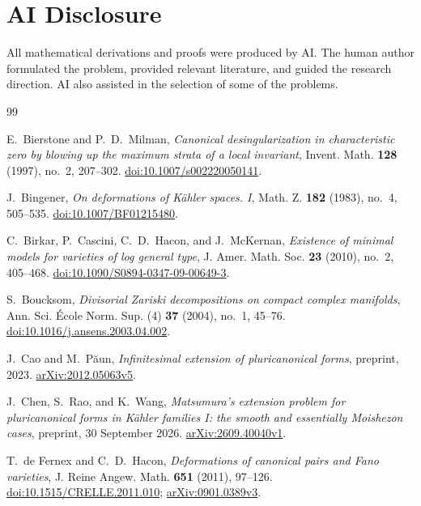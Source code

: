 \documentclass[11pt,a4paper]{article}
\numberwithin{equation}{section}
\theoremstyle{definition}
\theoremstyle{remark}
\begin{document}
\section*{AI Disclosure}
All mathematical derivations and proofs were produced by AI. The human
author formulated the problem, provided relevant literature, and guided
the research direction. AI also assisted in the selection of some of the
problems.
\begin{thebibliography}{99}
\small
\setlength{\itemsep}{4pt}
\setlength{\parsep}{0pt}
\setlength{\parskip}{0pt}
\raggedright
{}

E.~Bierstone and P.~D.~Milman,
\emph{Canonical desingularization in characteristic zero by
blowing up the maximum strata of a local invariant},
Invent. Math. \textbf{128} (1997), no.~2, 207--302.
\href{https://doi.org/10.1007/s002220050141}{doi:10.1007/s002220050141}.

J.~Bingener,
\emph{On deformations of Kähler spaces. I},
Math. Z. \textbf{182} (1983), no.~4, 505--535.
\href{https://doi.org/10.1007/BF01215480}{doi:10.1007/BF01215480}.

C.~Birkar, P.~Cascini, C.~D.~Hacon, and J.~McKernan,
\emph{Existence of minimal \mbox{models} for varieties of log general type},
J. Amer. Math. Soc. \textbf{23} (2010), no.~2, 405--468.
\href{https://doi.org/10.1090/S0894-0347-09-00649-3}{doi:10.1090/S0894-0347-09-00649-3}.

S.~Boucksom,
\emph{Divisorial Zariski decompositions on compact complex manifolds},
Ann. Sci. École Norm. Sup. (4) \textbf{37} (2004), no.~1, 45--76.
\href{https://doi.org/10.1016/j.ansens.2003.04.002}{doi:10.1016/j.ansens.2003.04.002}.

J.~Cao and M.~Păun,
\emph{Infinitesimal extension of pluricanonical forms},
preprint, 2023.
\href{https://arxiv.org/abs/2012.05063v5}{arXiv:2012.05063v5}.

J.~Chen, S.~Rao, and K.~Wang,
\emph{Matsumura's extension problem for pluricanonical forms in
Kähler families I: the smooth and essentially Moishezon cases},
preprint, 30 September 2026.
\href{https://arxiv.org/abs/2609.40040v1}{arXiv:2609.40040v1}.

T.~de Fernex and C.~D.~Hacon,
\emph{Deformations of canonical pairs and Fano varieties},
J. Reine Angew. Math. \textbf{651} (2011), 97--126.
\href{https://doi.org/10.1515/CRELLE.2011.010}{doi:10.1515/CRELLE.2011.010};
\href{https://arxiv.org/abs/0901.0389v3}{\mbox{arXiv:0901.0389v3}}.


\end{thebibliography}
\end{document}
